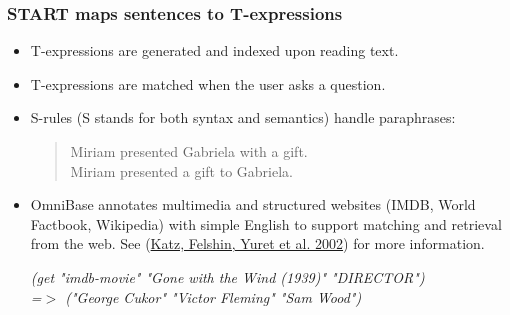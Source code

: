 \documentclass[ignorenonframetext]{beamer}
\begin{document}
\begin{frame}\frametitle{START maps sentences to T-expressions}
\begin{itemize}
\item T-expressions are generated and indexed upon reading text.
\item T-expressions are matched when the user asks a question.
\item S-rules (S stands for both syntax and semantics) handle paraphrases:
\begin{quote}
Miriam presented Gabriela with a gift.\\
Miriam presented a gift to Gabriela.
\end{quote}
\item OmniBase annotates multimedia and structured websites (IMDB,
  World Factbook, Wikipedia) with simple English to support matching
  and retrieval from the web.  See
  (\href{http://www.denizyuret.com/pub/nldb02/Katz-etal-NLDB02.pdf}{Katz,
    Felshin, Yuret et al. 2002}) for more information.
\vspace*{1em}

{\small\sl
(get "imdb-movie" "Gone with the Wind (1939)" "DIRECTOR") 
\\ =$>$ ("George Cukor" "Victor Fleming" "Sam Wood")
}
\end{itemize}
\end{frame}
\end{document}
